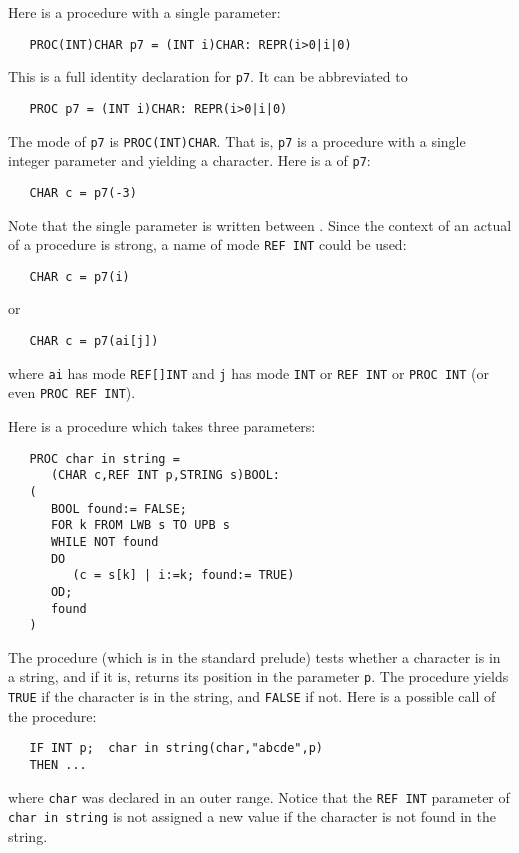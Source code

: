 Here is a procedure with a single parameter:
\begin{verbatim}
   PROC(INT)CHAR p7 = (INT i)CHAR: REPR(i>0|i|0)
\end{verbatim}
\noindent
This is a full identity declaration for \verb|p7|. It can be
abbreviated to
\begin{verbatim}
   PROC p7 = (INT i)CHAR: REPR(i>0|i|0)
\end{verbatim}
\noindent
The mode of \verb|p7| is \verb|PROC(INT)CHAR|. That is, \verb|p7| is a
procedure with a single integer parameter and yielding a character.
Here is a  of \verb|p7|:
\begin{verbatim}
   CHAR c = p7(-3)
\end{verbatim}
\noindent
Note that the single parameter is written between
. Since the context of an actual
 of a procedure is strong, a name of
mode \verb|REF INT| could be used:
\begin{verbatim}
   CHAR c = p7(i)
\end{verbatim}
\noindent
or
\begin{verbatim}
   CHAR c = p7(ai[j])
\end{verbatim}
\noindent
where \verb|ai| has mode \verb|REF[]INT| and \verb|j| has mode
\verb|INT| or \verb|REF INT| or \verb|PROC INT| (or even
\verb|PROC REF INT|).

Here is a procedure which takes three parameters:
\begin{verbatim}
   PROC char in string =
      (CHAR c,REF INT p,STRING s)BOOL:
   (
      BOOL found:= FALSE;
      FOR k FROM LWB s TO UPB s
      WHILE NOT found
      DO
         (c = s[k] | i:=k; found:= TRUE)
      OD;
      found
   )
\end{verbatim}
\noindent
\hypertarget{rout-chinstr}{}\label{rout-chinstr}
The procedure (which is in the standard prelude) tests whether a
character is in a string, and if it is, returns its position in the
parameter \verb|p|. The procedure yields \verb|TRUE| if the character
is in the string, and \verb|FALSE| if not. Here is a possible call of
the procedure:
\begin{verbatim}
   IF INT p;  char in string(char,"abcde",p)
   THEN ...
\end{verbatim}
\noindent
where \verb|char| was declared in an outer range. Notice that the
\verb|REF INT| parameter of \verb|char in string| is not assigned a
new value if the character is not found in the string.

